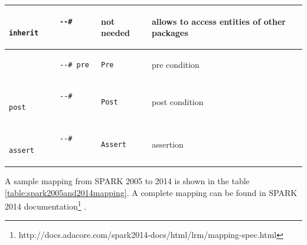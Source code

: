 \begin{center}
\begin{longtable}{| p{1.5in} | p{1.5in} | p{3in} |}
		\\ \hline

		\begin{lstlisting}
			--# inherit
		\end{lstlisting} 
		& 
		not needed
		& 
		allows to access entities of other packages

		\\ \hline

		\begin{lstlisting}
			--# pre
		\end{lstlisting} 
		& 
		\begin{lstlisting}[language=ada2012]
			Pre
		\end{lstlisting} 
		& 
		pre condition

		\\ \hline
		

		\begin{lstlisting}
			--# post
		\end{lstlisting} 
		& 
		\begin{lstlisting}[language=ada2012]
			Post
		\end{lstlisting} 
		& 
		post condition

		\\ \hline
		

		\begin{lstlisting}
			--# assert
		\end{lstlisting} 
		& 
		\begin{lstlisting}[language=ada2012]
			Assert
		\end{lstlisting} 
		& 
		assertion

		\\ \hline
	\end{longtable}
\end{center}
\doublespacing

A sample mapping from SPARK 2005 to 2014 is shown in the table \ref{table:spark2005and2014mapping}. A complete mapping can be found in SPARK 2014 documentation\footnote{http://docs.adacore.com/spark2014-docs/html/lrm/mapping-spec.html} \cite{Spark2014refManual:Online}.

